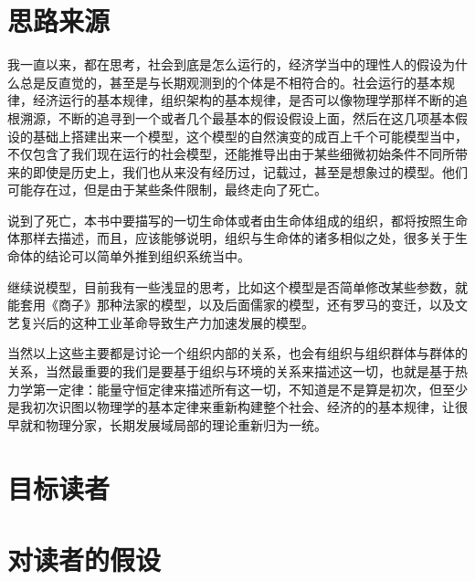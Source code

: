 \section{思路来源}
我一直以来，都在思考，社会到底是怎么运行的，经济学当中的理性人的假设为什么总是反直觉的，甚至是与长期观测到的个体是不相符合的。社会运行的基本规律，经济运行的基本规律，组织架构的基本规律，是否可以像物理学那样不断的追根溯源，不断的追寻到一个或者几个最基本的假设假设上面，然后在这几项基本假设的基础上搭建出来一个模型，这个模型的自然演变的成百上千个可能模型当中，不仅包含了我们现在运行的社会模型，还能推导出由于某些细微初始条件不同所带来的即使是历史上，我们也从来没有经历过，记载过，甚至是想象过的模型。他们可能存在过，但是由于某些条件限制，最终走向了死亡。

说到了死亡，本书中要描写的一切生命体或者由生命体组成的组织，都将按照生命体那样去描述，而且，应该能够说明，组织与生命体的诸多相似之处，很多关于生命体的结论可以简单外推到组织系统当中。

继续说模型，目前我有一些浅显的思考，比如这个模型是否简单修改某些参数，就能套用《商子》那种法家的模型，以及后面儒家的模型，还有罗马的变迁，以及文艺复兴后的这种工业革命导致生产力加速发展的模型。

当然以上这些主要都是讨论一个组织内部的关系，也会有组织与组织群体与群体的关系，当然最重要的我们是要基于组织与环境的关系来描述这一切，也就是基于热力学第一定律：能量守恒定律来描述所有这一切，不知道是不是算是初次，但至少是我初次识图以物理学的基本定律来重新构建整个社会、经济的的基本规律，让很早就和物理分家，长期发展域局部的理论重新归为一统。


\section{目标读者}

\section{对读者的假设}



